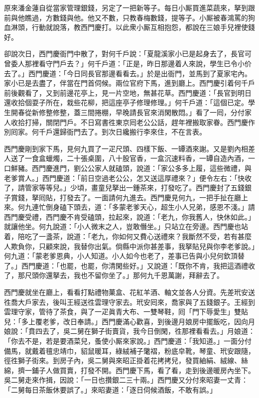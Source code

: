 原來潘金蓮自從當家管理銀錢，另定了一把新等子。每日小厮買進菜蔬來，拏到跟前與他瞧過，方數錢與他。{}他又不數，只教春梅數錢，提等子。小厮被春鴻罵的狗血淋頭，行動就說落，教西門慶打。以此衆小厮互相抱怨，都說在三娘手兒裡使錢好。

卻說次日，西門慶衙門中散了，對何千戶說：「夏龍溪家小已是起身去了，長官可曾委人那裡看守門戶去？」何千戶道：「正是，昨日那邊着人來說，學生已令小价去了。」西門慶道：「今日同長官那邊看看去。」於是出衙門，並馬到了夏家宅內。家小已是去盡了，伴當在門首伺候。兩位官府下馬，進到廳上。西門慶引着何千戶前後觀看了，又到前邊花亭上，見一片空地，無甚花草。西門慶道：「長官到明日還收拾個耍子所在，栽些花柳，把這座亭子修理修理。」何千戶道：「這個已定。學生開春從新修整修整，蓋三間捲棚，早晚請長官來消閑散悶。」看了一囘，分付家人收拾打掃，關閉門戶。不日寫書徃東京囘老公公話，趕年裡搬取家眷。西門慶作別囘家。何千戶還歸衙門去了。到次日纔搬行李來住，不在言表。

西門慶剛到家下馬，見何九買了一疋尺頭、四樣下飯、一罈酒來謝。又是劉內相差人送了一食盒蠟燭，二十張桌圍，八十股官香，一盒沉速料香，一罈自造內酒，一口鮮豬。西門慶進門，劉公公家人就磕頭，說道：「家公多多上履，這些微禮，與老爹賞人。」西門慶道：「前日空過老公公，怎又送這厚禮來？」便令左右：「快收了，請管家等等兒。」少頃，畫童兒拏出一鍾茶來，打發吃了。西門慶封了五錢銀子賞錢，拏囘貼，打發去了。一面請何九進去。西門慶見何九，一把手扯在廳上來。何九連忙倒身磕下頭去，道：「多蒙老爹天心，超生小人兄弟，感恩不淺。」請西門慶受禮，西門慶不肯受磕頭，拉起來，說道：「老九，你我舊人，快休如此。」就讓他坐。何九說道：「小人微末之人，豈敢僭坐。」只站立在旁邊。西門慶也站着，陪吃了一盞茶，說道：「老九，你如何又費心送禮來？我斷然不受，若有甚麼人欺負你，只顧來說，我替你出氣。倘縣中派你甚差事，我拏貼兒與你李老爹說。」何九道：「蒙老爹恩典，小人知道。小人如今也老了，差事已告與小兒何欽頂替了。」西門慶道：「也罷，也罷，你清閑些好。」又說道：「既你不肯，我把這酒禮收了，那尺頭你還拏去，我也不留你坐了。」那何九千恩萬謝，拜辭去了。

西門慶就坐在廳上，看看打點禮物菓盒、花紅羊酒、軸文並各人分資。先差玳安送徃喬大戶家去，後叫王經送徃雲理守家去。玳安囘來，喬家與了五錢銀子。王經到雲理守家，管待了茶食，與了一疋眞青大布、一雙琴鞋，囘「門下辱愛生」雙貼兒：「多上覆老爹，改日奉請。」西門慶滿心歡喜，到後邊月娘房中擺飯吃，因向月娘說：「賁四去了，吳二舅在獅子街賣貨，我今日倒閑，徃那裡看看去。」月娘道：「你去不是，若是要酒菜兒，蚤使小厮來家說。」西門慶道：「我知道。」一面分付備馬，就戴着氊忠靖巾，貂鼠暖耳，綠絨補子氅褶，粉底皁靴，琴童、玳安跟隨，徑徃獅子街來。到房子內，吳二舅與來昭正掛着花拷拷兒，發買紬絹、絨線、絲綿，擠一鋪子人做買賣，打發不開。西門慶下馬，看了看，走到後邊暖房內坐下。吳二舅走來作揖，因說：「一日也攢銀二三十兩。」西門慶又分付來昭妻一丈青：「二舅每日茶飯休要誤了。」來昭妻道：「逐日伺候酒飯，不敢有誤。」

